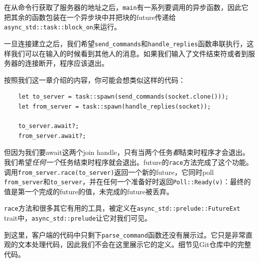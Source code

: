 在从命令行获取了服务器的地址之后，\texttt{main}有一系列要调用的异步函数，因此它把其余的函数包装在一个异步块中并把块的future传递给\texttt{async\_std::task::block\_on}来运行。

一旦连接建立之后，我们希望\texttt{send\_commands}和\texttt{handle\_replies}函数串联执行，这样我们可以在输入的时候看到其他人的消息。如果我们输入了文件结束符或者到服务器的连接断开，程序应该退出。

按照我们这一章介绍的内容，你可能会想类似这样的代码：
\begin{verbatim}
    let to_server = task::spawn(send_commands(socket.clone()));
    let from_server = task::spawn(handle_replies(socket));

    to_server.await?;
    from_server.await?;
\end{verbatim}

但因为我们要await这两个join handle，只有当两个任务\emph{都}结束时程序才会退出。我们希望\emph{任何一个}任务结束时程序就会退出。future的\texttt{race}方法完成了这个功能。调用\texttt{from\_server.race(to\_server)}返回一个新的future，它同时poll \texttt{from\_server}和\texttt{to\_server}，并在任何一个准备好时返回\texttt{Poll::Ready(v)}：最终的值是第一个完成的future的值，未完成的future被丢弃。

\texttt{race}方法和很多其它有用的工具，被定义在\texttt{async\_std::prelude::FutureExt} trait中，\texttt{async\_std::prelude}让它对我们可见。

到这里，客户端的代码中只剩下\texttt{parse\_command}函数还没有展示过。它只是非常直观的文本处理代码，因此我们不会在这里展示它的定义。细节见Git仓库中的完整代码。

